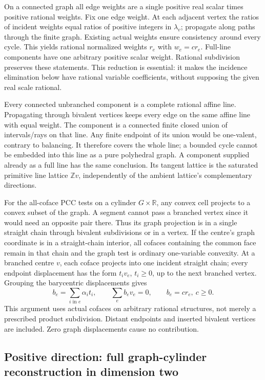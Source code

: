 \documentclass[
  11pt,
]{article}
\begin{document}
On a connected graph all edge weights are a single positive real scalar
times positive rational weights. Fix one edge weight. At each adjacent
vertex the ratios of incident weights equal ratios of positive integers
in \(\lambda_v\); propagate along paths through the finite graph.
Existing actual weights ensure consistency around every cycle. This
yields rational normalized weights \(r_e\) with \(w_e=c r_e\). Full-line
components have one arbitrary positive scalar weight. Rational
subdivision preserves these statements. This reduction is essential: it
makes the incidence elimination below have rational variable
coefficients, without supposing the given real scale rational.

Every connected unbranched component is a complete rational affine line.
Propagating through bivalent vertices keeps every edge on the same
affine line with equal weight. The component is a connected finite
closed union of intervals/rays on that line. Any finite endpoint of its
union would be one-valent, contrary to balancing. It therefore covers
the whole line; a bounded cycle cannot be embedded into this line as a
pure polyhedral graph. A component supplied already as a full line has
the same conclusion. Its tangent lattice is the saturated primitive line
lattice \(\mathbb{Z}v\), independently of the ambient lattice's
complementary directions.

For the all-coface PCC tests on a cylinder \(G\times\mathbb{R}\), any
convex cell projects to a convex subset of the graph. A segment cannot
pass a branched vertex since it would need an opposite pair there. Thus
its graph projection is in a single straight chain through bivalent
subdivisions or in a vertex. If the centre's graph coordinate is in a
straight-chain interior, all cofaces containing the common face remain
in that chain and the graph test is ordinary one-variable convexity. At
a branched centre \(v\), each coface projects into one incident straight
chain; every endpoint displacement has the form \(t_i v_e\),
\(t_i\geq0\), up to the next branched vertex. Grouping the barycentric
displacements gives \[
 b_e=\sum_{i\text{ in }e}\alpha_i t_i,
 \qquad\sum_e b_ev_e=0,\qquad b_e=c r_e,\ c\geq0.           \tag{9}
\] This argument uses actual cofaces on arbitrary rational structures,
not merely a prescribed product subdivision. Distant endpoints and
inserted bivalent vertices are included. Zero graph displacements cause
no contribution.

\subsection{Positive direction: full graph-cylinder reconstruction in
dimension
two}\label{positive-direction-full-graph-cylinder-reconstruction-in-dimension-two}
\end{document}
